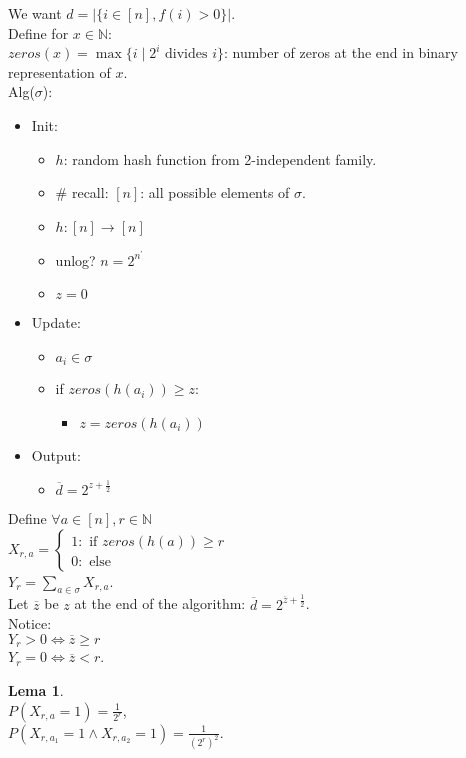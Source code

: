 \documentclass[a4paper, 12pt]{book}
\theoremstyle{definition}
\newtheorem{lemma}[counter]{Lema}
\theoremstyle{remark}
\newcommand{\N}{\mathbb{N}}
\begin{document}
We want $d = |\{i \in [n], f(i) > 0\}|$. \\
Define for $x \in \N$: \\
$zeros(x) = \max \{i \mid 2^i \text{ divides } i\}$: number of zeros at the end in binary representation of $x$. \\
Alg($\sigma$):
\begin{itemize}[label={}]
  \item Init:
  \begin{itemize}
    \item $h$: random hash function from 2-independent family.
    \item $\#$ recall: $[n]$: all possible elements of $\sigma$.
    \item $h: [n] \to [n]$
    \item unlog? $n = 2^{n^{'}}$
    \item $z = 0$
  \end{itemize}
  \item Update:
  \begin{itemize}[label={}]
    \item $a_i \in \sigma$
    \item if $zeros(h(a_i)) \geq z$:
    \begin{itemize}[label={}]
      \item $z = zeros(h(a_i))$
    \end{itemize}
  \end{itemize}
  \item Output:
  \begin{itemize}[label={}]
    \item $\overline{d} = 2^{z + \frac{1}{2}}$
  \end{itemize}
\end{itemize}
Define $\forall a \in [n], r \in \N$ \\
$X_{r, a} = \begin{cases}
  1: \text{ if } zeros(h(a)) \geq r \\
  0: \text{ else}
\end{cases}$ \\
$Y_r = \sum_{a \in \sigma} X_{r, a}$. \\
Let $\overline{z}$ be $z$ at the end of the algorithm: $\overline{d} = 2^{\overline{z} + \frac{1}{2}}$. \\
Notice: \\
$Y_r > 0 \iff \overline{z} \geq r$ \\
$Y_r = 0 \iff \overline{z} < r$.
\begin{lemma} \text{} \\
  $P(X_{r, a} = 1) = \frac{1}{2^r}$, \\
  $P(X_{r, a_1} = 1 \land X_{r, a_2} = 1) = \frac{1}{\left(2^r\right)^2}$.
\end{lemma}
\end{document}
